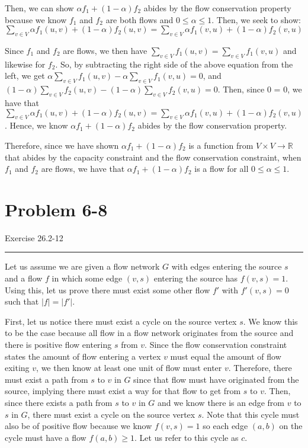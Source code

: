 \documentclass[11pt]{article}
\def\separateline{\medskip\hrule\medskip}
\begin{document}
Then, we can show $\alpha f_1 + (1-\alpha) f_2$ abides by the flow conservation property because we know $f_1$ and $f_2$ are both flows and $0 \leq \alpha \leq 1$. Then, we seek to show: $\sum_{v \in V}{\alpha f_1(u,v) + (1 - \alpha) f_2(u,v)} = \sum_{v \in V}{\alpha f_1(v,u) + (1 - \alpha) f_2(v,u)}$

Since $f_1$ and $f_2$ are flows, we then have $\sum_{v \in V}{f_1(u,v)} = \sum_{v \in V}{f_1(v,u)}$ and likewise for $f_2$. So, by subtracting the right side of the above equation from the left, we get $\alpha \sum_{v \in V}{f_1(u,v)} - \alpha \sum_{v \in V}{f_1(v,u)} = 0$, and $(1-\alpha) \sum_{v \in V}{f_2(u,v)} - (1 - \alpha) \sum_{v \in V}{f_2(v,u)} = 0$. Then, since 0 = 0, we have that $\sum_{v \in V}{\alpha f_1(u,v) + (1 - \alpha) f_2(u,v)} = \sum_{v \in V}{\alpha f_1(v,u) + (1 - \alpha) f_2(v,u)}$. Hence, we know $\alpha f_1 + (1-\alpha) f_2$ abides by the flow conservation property.

Therefore, since we have shown $\alpha f_1 + (1-\alpha) f_2$ is a function from $V \times V \rightarrow \mathbb{R}$ that abides by the capacity constraint and the flow conservation constraint, when $f_1$ and $f_2$ are flows, we have that $\alpha f_1 + (1-\alpha) f_2$ is a flow for all $0 \leq \alpha \leq 1$.


\newpage


\section{Problem 6-8}
Exercise 26.2-12
\separateline

Let us assume we are given a flow network $G$ with edges entering the source $s$ and a flow $f$ in which some edge $(v,s)$ entering the source has $f(v,s) = 1$. Using this, let us prove there must exist some other flow $f'$ with $f'(v,s) = 0$ such that $|f| = |f'|$.

First, let us notice there must exist a cycle on the source vertex $s$. We know this to be the case because all flow in a flow network originates from the source and there is positive flow entering $s$ from $v$. Since the flow conservation constraint states the amount of flow entering a vertex $v$ must equal the amount of flow exiting $v$, we then know at least one unit of flow must enter $v$. Therefore, there must exist a path from $s$ to $v$ in $G$ since that flow must have originated from the source, implying there must exist a way for that flow to get from $s$ to $v$. Then, since there exists a path from $s$ to $v$ in $G$ and we know there is an edge from $v$ to $s$ in $G$, there must exist a cycle on the source vertex $s$. Note that this cycle must also be of positive flow because we know $f(v,s) = 1$ so each edge $(a,b)$ on the cycle must have a flow $f(a,b) \geq 1$. Let us refer to this cycle as $c$.
\end{document}
